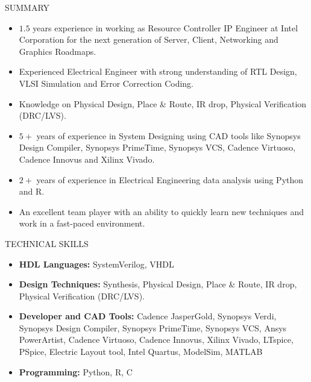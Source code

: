 \documentclass{resume} %
\begin{document}
\begin{rSection}{SUMMARY}
    \begin{itemize}
        \itemsep -3pt {}
        \item $1.5$ years experience in working as Resource Controller IP Engineer at Intel Corporation for the next generation of Server, Client, Networking and Graphics Roadmaps.
        \item Experienced Electrical Engineer with strong understanding of RTL Design, VLSI Simulation and Error Correction Coding.
        \item Knowledge on Physical Design, Place \& Route, IR drop, Physical Verification (DRC/LVS).
        \item $5+$ years of experience in System Designing using CAD tools like Synopsys Design Compiler, Synopsys PrimeTime, Synopsys VCS, Cadence Virtuoso, Cadence Innovus and Xilinx Vivado.
        \item $2+$ years of experience in Electrical Engineering data analysis using Python and R.
        \item An excellent team player with an ability to quickly learn new techniques and work in a fast-paced environment. 
    \end{itemize}
\end{rSection}

\begin{rSection}{TECHNICAL SKILLS}
    \begin{itemize}
        \itemsep -3pt {} 
        \item \textbf{HDL Languages:} SystemVerilog, VHDL
        \item \textbf{Design Techniques:} Synthesis, Physical Design, Place \& Route, IR drop, Physical Verification (DRC/LVS).
        \item \textbf{Developer and CAD Tools:} Cadence JasperGold, Synopsys Verdi, Synopsys Design Compiler, Synopsys PrimeTime, Synopsys VCS, Ansys PowerArtist, Cadence Virtuoso, Cadence Innovus, Xilinx Vivado, LTspice, PSpice, Electric Layout tool, Intel Quartus, ModelSim, MATLAB
        \item \textbf{Programming:} Python, R, C
    \end{itemize}
\end{rSection}
\end{document}
